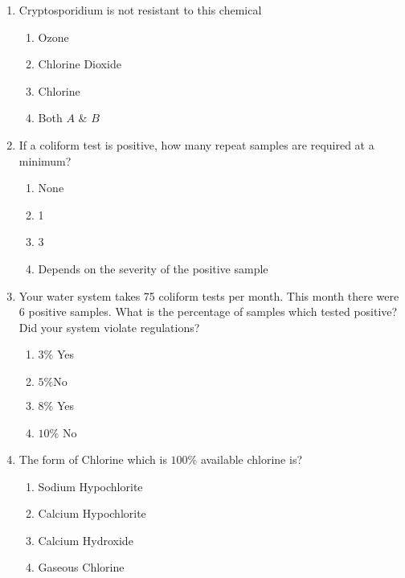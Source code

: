 \begin{enumerate}
\item Cryptosporidium is not resistant to this chemical\\
\begin{enumerate}
\item Ozone\\
\item Chlorine Dioxide\\
\item Chlorine\\
\item Both $A$ \& $B$
\end{enumerate}

\item  If a coliform test is positive, how many repeat samples are required at a minimum?\\
\begin{enumerate}
\item None\\
\item 1\\
\item 3\\
\item Depends on the severity of the positive sample
\end{enumerate}

\item  Your water system takes 75 coliform tests per month. This month there were 6 positive samples. What is the percentage of samples which tested positive? Did your system violate regulations?\\
\begin{enumerate}
\item $3 \%$ Yes\\
\item $5 \% \mathrm{No}$\\
\item $8 \%$ Yes\\
\item $10 \%$ No
\end{enumerate}

  \item The form of Chlorine which is $100 \%$ available chlorine is?\\
\begin{enumerate}
\item Sodium Hypochlorite\\
\item Calcium Hypochlorite\\
\item Calcium Hydroxide\\
\item Gaseous Chlorine
\end{enumerate}


\end{enumerate}
